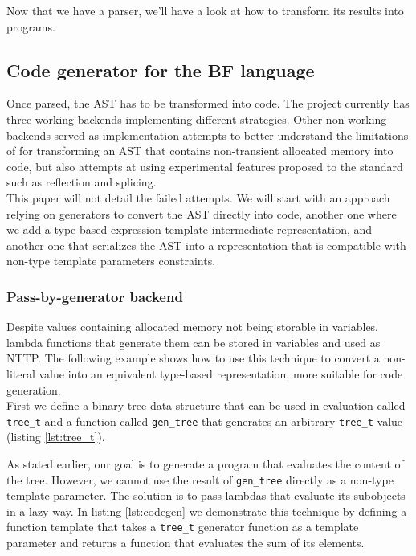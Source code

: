 \documentclass[../../main.tex]{subfiles}
\begin{document}
Now that we have a \constexpr parser, we'll have a look at how to transform its
results into programs.

\subsection{Code generator for the BF language}

Once parsed, the AST has to be transformed into \cpp code. The project currently
has three working backends implementing different strategies. Other
non-working backends served as implementation attempts to better understand the
limitations of  for transforming an AST that contains non-transient
allocated memory into \cpp code, but also attempts at using experimental
features proposed to the \cpp standard such as reflection and
splicing\cite{scalable-reflection}.\\

This paper will not detail the failed attempts. We will start with an approach
relying on generators to convert the AST directly into code, another one where
we add a type-based expression template intermediate representation, and another
one that serializes the AST into a representation that is compatible with
non-type template parameters constraints.

\subsubsection{Pass-by-generator backend}

Despite values containing \constexpr allocated memory not being storable in
\constexpr variables, lambda functions that generate them can be stored in
\constexpr variables and used as NTTP. The following example shows how to use
this technique to convert a non-literal \constexpr value into an equivalent
type-based representation, more suitable for code generation.\\

First we define a binary tree data structure that can be used in
\constexpr evaluation called \lstinline|tree_t| and a
\constexpr function called \lstinline|gen_tree| that generates an arbitrary
\lstinline|tree_t| value (listing \ref{lst:tree_t}).



As stated earlier, our goal is to generate a program that evaluates the content
of the tree. However, we cannot use the result of \lstinline|gen_tree| directly
as a non-type template parameter. The solution is to pass lambdas that evaluate
its subobjects in a lazy way. In listing \ref{lst:codegen} we demonstrate this
technique by defining a function template that takes a \lstinline|tree_t|
generator function as a template parameter and returns a function that evaluates
the sum of its elements.\\
\end{document}

